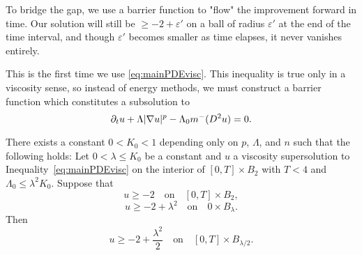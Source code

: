 To bridge the gap, we use a barrier function to "flow" the improvement forward in time.  Our solution will still be $\geq -2 + \varepsilon'$ on a ball of radius $\varepsilon'$ at the end of the time interval, and though $\varepsilon'$ becomes smaller as time elapses, it never vanishes entirely.  

This is the first time we use \eqref{eq:mainPDEvisc}.  This inequality is true only in a viscosity sense, so instead of energy methods, we must construct a barrier function which constitutes a subsolution to 
\[ \partial_t u + \Lambda |\nabla u|^p - \Lambda_0 m^-(D^2 u) = 0. \]

\begin{proposition}\label{th:flowforward}
There exists a constant $0 < K_0 < 1$ depending only on $p$, $\Lambda$, and $n$ such that the following holds:
Let $0 < \lambda \leq K_0$ be a constant and $u$ a viscosity supersolution to Inequality~\eqref{eq:mainPDEvisc} on the interior of $[0,T]\times B_2$ with $T < 4$ and $\Lambda_0 \leq \lambda^2 K_0$.  Suppose that
\[ u \geq -2 \quad \textrm{on} \quad [0,T] \times B_2,\]
\[ u \geq -2 + \lambda^2 \quad \textrm{on} \quad 0 \times B_\lambda.\]
Then
\[ u \geq -2+\frac{\lambda^2}{2} \quad \textrm{on} \quad [0,T] \times B_{\lambda/2}.\]  
\end{proposition}

